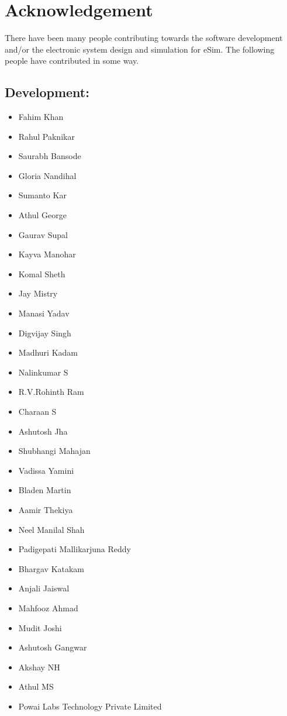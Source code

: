 \section*{Acknowledgement}

There  have  been  many  people contributing towards the software development and/or the electronic system design and simulation for eSim. The following people have contributed in some way.

\subsection*{Development:}
\begin{multicols}{3}
\begin{itemize}
    \item Fahim Khan
    \item Rahul Paknikar
    \item Saurabh Bansode
    \item Gloria Nandihal
    \item Sumanto Kar
    \item Athul George
    \item Gaurav Supal
    \item Kayva Manohar
    \item Komal Sheth


    \item Jay Mistry
    \item Manasi Yadav
    \item Digvijay Singh
    \item Madhuri Kadam
    \item Nalinkumar S
    \item R.V.Rohinth Ram
    \item Charaan S
    \item Ashutosh Jha
    \item Shubhangi Mahajan
    \item Vadissa Yamini
    \item Bladen Martin
    \item Aamir Thekiya
    
    
    \item Neel Manilal Shah
    \item Padigepati Mallikarjuna Reddy
    \item Bhargav Katakam
    \item Anjali Jaiswal
    \item Mahfooz Ahmad
    
    \item Mudit Joshi
    \item Ashutosh Gangwar
    \item Akshay NH
    \item Athul MS
    
    
    \item Powai Labs Technology Private Limited

\end{itemize}
\end{multicols}


